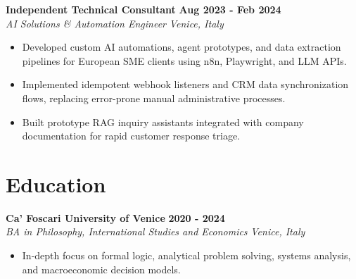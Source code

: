 \documentclass[10pt,a4paper]{article}
\newcommand{\role}[4]{%
  \textbf{#1} \hfill \textbf{#2}\\[1pt]%
  \textit{#3} \hfill \textit{#4}\\[2pt]%
}
\begin{document}
\role{Independent Technical Consultant}{Aug 2023 - Feb 2024}{AI Solutions \& Automation Engineer}{Venice, Italy}
\begin{itemize}
  \item Developed custom AI automations, agent prototypes, and data extraction pipelines for European SME clients using n8n, Playwright, and LLM APIs.
  \item Implemented idempotent webhook listeners and CRM data synchronization flows, replacing error-prone manual administrative processes.
  \item Built prototype RAG inquiry assistants integrated with company documentation for rapid customer response triage.
\end{itemize}

\section{Education}
\role{Ca' Foscari University of Venice}{2020 - 2024}{BA in Philosophy, International Studies and Economics}{Venice, Italy}
\begin{itemize}
  \item In-depth focus on formal logic, analytical problem solving, systems analysis, and macroeconomic decision models.
\end{itemize}
\end{document}
